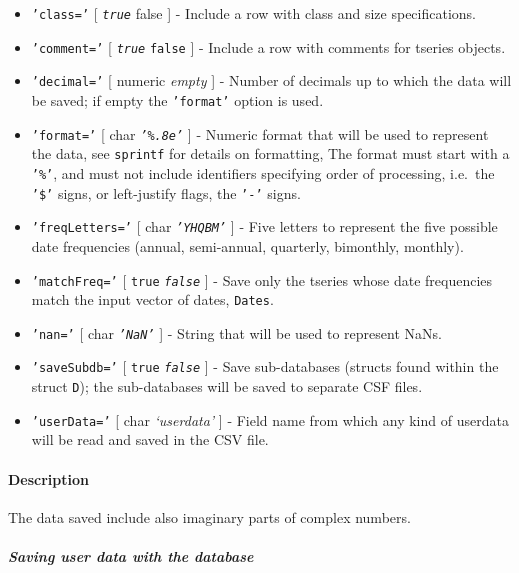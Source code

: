 \begin{itemize}
\item
  \texttt{'class='} {[} \emph{\texttt{true}} \textbar{} false {]} -
  Include a row with class and size specifications.
\item
  \texttt{'comment='} {[} \emph{\texttt{true}} \textbar{} \texttt{false}
  {]} - Include a row with comments for tseries objects.
\item
  \texttt{'decimal='} {[} numeric \textbar{} \emph{empty} {]} - Number
  of decimals up to which the data will be saved; if empty the
  \texttt{'format'} option is used.
\item
  \texttt{'format='} {[} char \textbar{} \emph{\texttt{'\%.8e'}} {]} -
  Numeric format that will be used to represent the data, see
  \texttt{sprintf} for details on formatting, The format must start with
  a \texttt{'\%'}, and must not include identifiers specifying order of
  processing, i.e.~the \texttt{'\$'} signs, or left-justify flags, the
  \texttt{'-'} signs.
\item
  \texttt{'freqLetters='} {[} char \textbar{} \emph{\texttt{'YHQBM'}}
  {]} - Five letters to represent the five possible date frequencies
  (annual, semi-annual, quarterly, bimonthly, monthly).
\item
  \texttt{'matchFreq='} {[} \texttt{true} \textbar{}
  \emph{\texttt{false}} {]} - Save only the tseries whose date
  frequencies match the input vector of dates, \texttt{Dates}.
\item
  \texttt{'nan='} {[} char \textbar{} \emph{\texttt{'NaN'}} {]} - String
  that will be used to represent NaNs.
\item
  \texttt{'saveSubdb='} {[} \texttt{true} \textbar{}
  \emph{\texttt{false}} {]} - Save sub-databases (structs found within
  the struct \texttt{D}); the sub-databases will be saved to separate
  CSF files.
\item
  \texttt{'userData='} {[} char \textbar{} \emph{`userdata'} {]} - Field
  name from which any kind of userdata will be read and saved in the CSV
  file.
\end{itemize}

\paragraph{Description}

The data saved include also imaginary parts of complex numbers.

\subparagraph{Saving user data with the
database}

